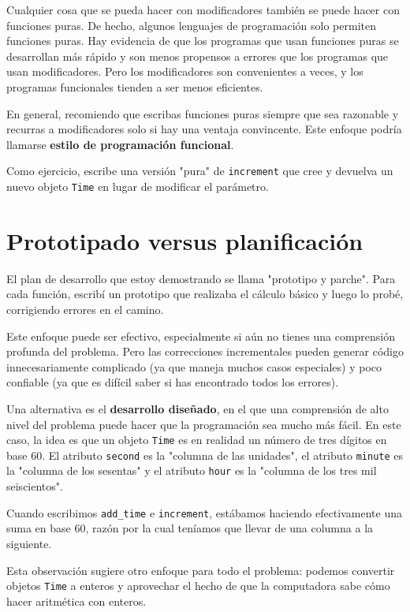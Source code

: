 Cualquier cosa que se pueda hacer con modificadores también se puede hacer con funciones puras. De hecho, algunos lenguajes de programación solo permiten funciones puras. Hay evidencia de que los programas que usan funciones puras se desarrollan más rápido y son menos propensos a errores que los programas que usan modificadores. Pero los modificadores son convenientes a veces, y los programas funcionales tienden a ser menos eficientes.

En general, recomiendo que escribas funciones puras siempre que sea razonable y recurras a modificadores solo si hay una ventaja convincente. Este enfoque podría llamarse \textbf{estilo de programación funcional}.

Como ejercicio, escribe una versión "pura" de \texttt{increment} que cree y devuelva un nuevo objeto \texttt{Time} en lugar de modificar el parámetro.

\section{Prototipado versus planificación}

El plan de desarrollo que estoy demostrando se llama "prototipo y parche". Para cada función, escribí un prototipo que realizaba el cálculo básico y luego lo probé, corrigiendo errores en el camino.

Este enfoque puede ser efectivo, especialmente si aún no tienes una comprensión profunda del problema. Pero las correcciones incrementales pueden generar código innecesariamente complicado (ya que maneja muchos casos especiales) y poco confiable (ya que es difícil saber si has encontrado todos los errores).

Una alternativa es el \textbf{desarrollo diseñado}, en el que una comprensión de alto nivel del problema puede hacer que la programación sea mucho más fácil. En este caso, la idea es que un objeto \texttt{Time} es en realidad un número de tres dígitos en base 60. El atributo \texttt{second} es la "columna de las unidades", el atributo \texttt{minute} es la "columna de los sesentas" y el atributo \texttt{hour} es la "columna de los tres mil seiscientos".

Cuando escribimos \texttt{add\_time} e \texttt{increment}, estábamos haciendo efectivamente una suma en base 60, razón por la cual teníamos que llevar de una columna a la siguiente.

Esta observación sugiere otro enfoque para todo el problema: podemos convertir objetos \texttt{Time} a enteros y aprovechar el hecho de que la computadora sabe cómo hacer aritmética con enteros.


